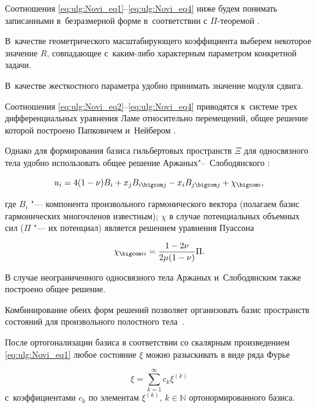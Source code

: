 Соотношения \eqref{eq:ulg:Novi_eq1}--\eqref{eq:ulg:Novi_eq4} ниже будем понимать записанными в~безразмерной форме в~соответствии с $\Pi$-теоремой \cite{Novi_bib_Sedov}. 

В~качестве геометрического масштабирующего коэффициента выберем некоторое значение $R$, совпадающее с~каким-либо характерным параметром конкретной задачи. 

В~качестве жесткостного параметра удобно принимать значение модуля сдвига. 



Соотношения \eqref{eq:ulg:Novi_eq2}--\eqref{eq:ulg:Novi_eq4} приводятся к~системе трех дифференциальных уравнения Ламе относительно перемещений, общее решение которой построено Папковичем и~Нейбером \cite{Novi_bib7}. 

Однако для формирования базиса гильбертовых пространств $\Xi $  для односвязного тела удобно использовать общее решение Аржаных"--~Слободянского \cite{Novi_bib3}:

\begin{equation} \label{eq:ulg:Novi_eq05}

u _{i} = 4(1- \nu) B_{i} + x_{j} B_{i \bigcom j} - x_{i} B_{j\bigcom j}+ \chi _{\bigcom i},

\end{equation}

где $B_{i}$ "--- компонента произвольного гармонического вектора (полагаем базис гармонических многочленов известным);  $\chi$  в случае потенциальных объемных сил ($\Pi$  "---  их потенциал) является решением уравнения Пуассона

\begin{equation} \label{eq:ulg:Novi_eq06}

\chi _{\bigcom  i i}=\frac{1-2\nu}{2\mu (1-\nu)}\Pi.

\end{equation}

В случае неограниченного односвязного тела Аржаных и~Слободянским также построено общее решение. 

Комбинирование обеих форм решений позволяет организовать базис пространств состояний для произвольного полостного тела~\cite{Novi_bib8}. 



После ортогонализации базиса в соответствии со скалярным произведением \eqref{eq:ulg:Novi_eq1} любое состояние $\xi$ можно разыскивать в виде ряда Фурье  

$$\xi = \sum _{k=1}^{\infty }c_{k} \xi^{(k)}$$ с~коэффициентами  $c_{k}$   по элементам $\xi^{(k)}$, $k \in \mathbb N $  ортонормированного базиса. 



